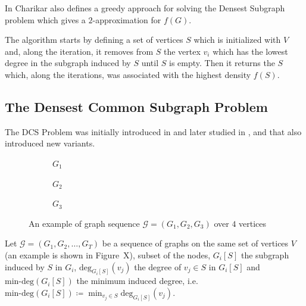 In \cite{charikar2000greedy} Charikar also defines a greedy approach for
solving the Densest Subgraph problem which gives a $2$-approximation for
$f(G)$.

The algorithm starts by defining a set of vertices $S$ which is initialized
with $V$ and, along the iteration, it removes from $S$ the vertex $v_i$ which
has the lowest degree in the subgraph induced by $S$ until $S$ is empty. Then
it returns the $S$ which, along the iterations, was associated with the highest
density $f(S)$.



\subsection{The Densest Common Subgraph Problem}%
\label{sub:the_common_densest_subgraph_problem}

The \acrfull{DCS} Problem was initially introduced in \cite{jethava2015finding}
and later studied in \cite{andersson2016finding}, \cite{charikar2018finding}
and \cite{semertzidis2019finding} that also introduced new variants.

\begin{figure}
	\begin{center}
		\begin{subfigure}[b]{0.3\textwidth}
			\centering
			\caption{$G_1$}
			\label{fig:graph_sequence_example1}
		\end{subfigure}
		\begin{subfigure}[b]{0.3\textwidth}
			\centering
			\caption{$G_2$}
			\label{fig:graph_sequence_example2}
		\end{subfigure}
		\begin{subfigure}[b]{0.3\textwidth}
			\centering
			\caption{$G_3$}
			\label{fig:graph_sequence_example3}
		\end{subfigure}
	\end{center}
	\caption[Example sequence graph]{An example of graph sequence $\mathcal{G} = (G_1, G_2, G_3) $ over $4$ vertices}
	\label{fig:graph_sequence_example}
\end{figure}

Let $\mathcal{G} = (G_1, G_2, \dots, G_T) $ be a sequence of graphs on the same
set of vertices $V$ (an example is shown in Figure~X), %
subset of the nodes, $G_i[S]$ the subgraph induced by $S$ in $G_i$,
$\text{deg}_{G_i[S]} (v_{j} )$ the degree of $v_{j} \in S$ in $G_i[S]$ and
$\text{min-deg}(G_i[S])$ the minimum induced degree, i.e.
$\text{min-deg}(G_i[S]) \coloneqq \min _{v_{j}  \in S} \text{deg} _{G_i[S]}
	(v_{j}) $.

